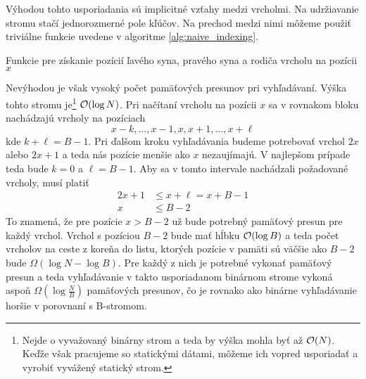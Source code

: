 Výhodou tohto usporiadania sú implicitné vzťahy medzi vrcholmi. Na udržiavanie stromu stačí jednorozmerné pole kľúčov. Na prechod medzi nimi môžeme použiť triviálne funkcie uvedene v algoritme \ref{alg:naive_indexing}.

\begin{algorithm}[H]
	\caption{Funkcie pre získanie pozícií ľavého syna, pravého syna a rodiča vrcholu na pozícii $x$}
    \label{alg:naive_indexing}
	\begin{minipage}[t]{0.3\textwidth}
	    \begin{algorithmic}[1]
	            \State {}
	        \EndFunction
	    \end{algorithmic}
	\end{minipage} \hfill
	\begin{minipage}[t]{0.3\textwidth}
	    \begin{algorithmic}[1]
	            \State {}
	        \EndFunction
	    \end{algorithmic}
	\end{minipage} \hfill
	\begin{minipage}[t]{0.3\textwidth}
	    \begin{algorithmic}[1]
	            \State {}
	        \EndFunction
	    \end{algorithmic}
	\end{minipage}
\end{algorithm}

Nevýhodou je však vysoký počet pamäťových presunov pri vyhľadávaní. Výška tohto stromu je\footnote{Nejde o vyvažovaný binárny strom a teda by výška mohla byť až $\mathcal{O}(N)$. Keďže však pracujeme so statickými dátami, môžeme ich vopred usporiadať a vyrobiť vyvážený statický strom.} $\mathcal{O}(\log{N})$. Pri načítaní vrcholu na pozícii $x$ sa v rovnakom bloku nachádzajú vrcholy na pozíciach
\[
x-k,\dotsc,x-1,x,x+1,\dotsc,x+\ell
\]
kde $k+\ell=B-1$. Pri ďalšom kroku vyhľadávania budeme potrebovať vrchol $2x$ alebo $2x+1$ a teda nás pozície menšie ako $x$ nezaujímajú. V najlepšom prípade teda bude $k=0$ a $\ell=B-1$. Aby sa v tomto intervale nachádzali požadované vrcholy, musí platiť
\[
\begin{aligned}
2x+1 &\le x+\ell = x+B-1 \\
x &\le B-2
\end{aligned}
\]
To znamená, že pre pozície $x > B - 2$ už bude potrebný pamäťový presun pre každý vrchol. Vrchol s pozíciou $B-2$ bude mať hĺbku $\mathcal{O}(\log{B})$ a teda počet vrcholov na ceste z koreňa do listu, ktorých pozície v pamäti sú väčšie ako $B-2$ bude $\Omega(\log{N}-\log{B})$. Pre každý z nich je potrebné vykonať pamäťový presun a teda vyhľadávanie v takto usporiadanom binárnom strome vykoná aspoň $\Omega(\log{\frac{N}{B}})$ pamäťových presunov, čo je rovnako ako binárne vyhľadávanie horšie v porovnaní s \aware B-stromom.


